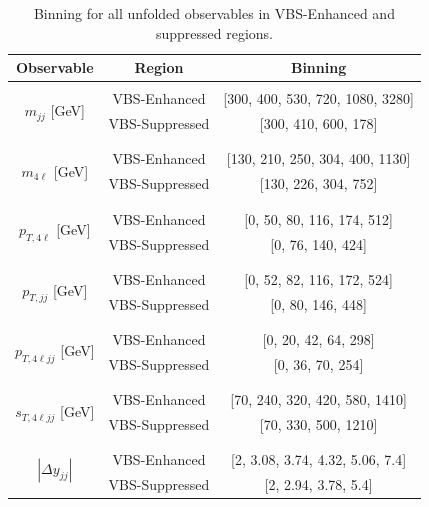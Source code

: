 \begin{table}
    \caption{Binning for all unfolded observables in VBS-Enhanced and suppressed regions. \label{tab:binning}}
    \begin{center}
    \begin{tabular}{ | c | c | c | }
    \hline
    Observable & Region & Binning \\
    \hline \hline
    \multirow{4}{*}{ $m_{jj}$ [GeV] } &  &  \\
        & VBS-Enhanced & [300, 400, 530, 720, 1080, 3280] \\
    & VBS-Suppressed & [300, 410, 600, 178] \\
    & &\\
    \hline
    \multirow{4}{*}{ $m_{4\ell}$ [GeV] } &  &  \\
        & VBS-Enhanced & [130, 210, 250, 304, 400, 1130] \\
    & VBS-Suppressed & [130, 226, 304, 752] \\
    & &\\
    \hline
    \multirow{4}{*}{ $p_{T,4\ell}$ [GeV] } &  &  \\
    & VBS-Enhanced & [0, 50, 80, 116, 174, 512] \\
    & VBS-Suppressed & [0, 76, 140, 424]\\
    & &\\
    \hline
    \multirow{4}{*}{ $p_{T,jj}$ [GeV] } &  &  \\
    & VBS-Enhanced & [0, 52, 82, 116, 172, 524] \\
    & VBS-Suppressed & [0, 80, 146, 448]\\
    & &\\
    \hline
    \multirow{4}{*}{ $p_{T,4\ell jj}$ [GeV] } &  &  \\
    & VBS-Enhanced & [0, 20, 42, 64, 298] \\
    & VBS-Suppressed & [0, 36, 70, 254]\\
    & &\\
    \hline
    \multirow{4}{*}{ $s_{T,4\ell jj}$ [GeV] } &  &  \\
    & VBS-Enhanced & [70, 240, 320, 420, 580, 1410] \\
    & VBS-Suppressed & [70, 330, 500, 1210]\\
    & &\\
    \hline
    \multirow{4}{*}{ $|\Delta y_{jj}|$ } &  &  \\
    & VBS-Enhanced & [2, 3.08, 3.74, 4.32, 5.06, 7.4] \\
    & VBS-Suppressed & [2, 2.94, 3.78, 5.4]\\

\end{tabular}
\end{center}
\end{table}
